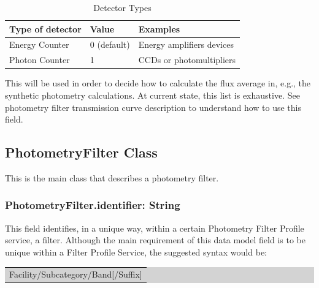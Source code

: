 \documentclass[11pt,a4paper]{ivoa}
\begin{document}


\begin{table}[ht]
 			\centering
\begin{tabular}{p{2.42in}p{0.8in}p{1.55in}}
\hline
\multicolumn{1}{|p{2.42in}}{Type of detector} &
\multicolumn{1}{|p{0.8in}}{Value} &
\multicolumn{1}{|p{1.55in}|}{Examples} \\
\hline
\multicolumn{1}{|p{2.42in}}{Energy Counter} &
\multicolumn{1}{|p{0.8in}}{0 (default)} &
\multicolumn{1}{|p{1.55in}|}{Energy amplifiers devices} \\
\hline
\multicolumn{1}{|p{2.42in}}{Photon Counter} &
\multicolumn{1}{|p{0.8in}}{1} &
\multicolumn{1}{|p{1.55in}|}{CCDs or photomultipliers} \\
\hline
\end{tabular}
\caption{Detector Types}
 \end{table}



This will be used in order to decide how to calculate the flux average in, e.g., the synthetic photometry calculations. At current state, this list is exhaustive. See photometry filter transmission curve description to understand how to use this field.
\par

\subsection{PhotometryFilter Class}
This is the main class that describes a photometry filter.
\par

\subsubsection{PhotometryFilter.identifier: String}
This field identifies, in a unique way, within a certain Photometry Filter Profile service, a filter. Although the main requirement of this data model field is to be unique within a Filter Profile Service, the suggested syntax would be:
\par

\bigskip
\par
\begingroup\setlength{\fboxsep}{0pt}
\colorbox{lightgray}{%
\begin{tabular}{|p{5.53in}|}
Facility/Subcategory/Band[/Suffix]
\end{tabular}%
}\endgroup
\par
\bigskip
\end{document}
